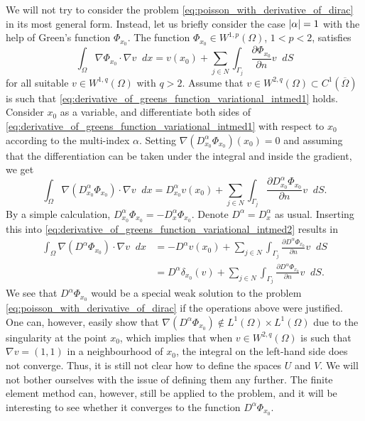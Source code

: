 \documentclass[english, 12pt, a4paper, sci, utf8, a-2b, online]{aaltothesis}
\theoremstyle{definition}
\theoremstyle{plain}
\DeclarePairedDelimiter\abs{\lvert}{\rvert}
\newcommand*\diff{\mathop{}\!d}
\numberwithin{equation}{section}
\begin{document}
We will not try to consider the problem \eqref{eq:poisson_with_derivative_of_dirac}
in its most general form.
Instead, let us briefly consider the case $\abs{\alpha} = 1$
with the help of Green's function $\Phi_{x_0}$.
The function $\Phi_{x_0} \in W^{1,p}(\Omega)$, $1 < p < 2$, satisfies
\begin{equation}
    \label{eq:derivative_of_greens_function_variational_intmed1}
    \int_{\Omega} \nabla \Phi_{x_0} \cdot \nabla v \diff x
    = v(x_0) + \sum_{j \in N} \int_{\Gamma_j}
        \frac{\partial \Phi_{x_0}}{\partial n} v \diff S
\end{equation}
for all suitable $v \in W^{1,q}(\Omega)$ with $q > 2$.
Assume that $v \in W^{2,q}(\Omega) \subset C^1(\overline{\Omega})$ is
such that \eqref{eq:derivative_of_greens_function_variational_intmed1} holds.
Consider $x_0$ as a variable, and differentiate both sides of
\eqref{eq:derivative_of_greens_function_variational_intmed1}
with respect to $x_0$ according to the multi-index $\alpha$.
Setting $\nabla (D_{x_0}^{\alpha} \Phi_{x_0})(x_0) = 0$ and
assuming that the differentiation can be taken under the integral
and inside the gradient, we get
\begin{equation}
    \label{eq:derivative_of_greens_function_variational_intmed2}
    \int_{\Omega} \nabla (D_{x_0}^{\alpha} \Phi_{x_0}) \cdot \nabla v \diff x
    = D_{x_0}^{\alpha} v(x_0) + \sum_{j \in N} \int_{\Gamma_j}
        \frac{\partial D_{x_0}^{\alpha} \Phi_{x_0}}{\partial n} v \diff S.
\end{equation}
By a simple calculation,
$D_{x_0}^{\alpha} \Phi_{x_0} = -D_x^{\alpha} \Phi_{x_0}$.
Denote $D^{\alpha} = D_x^{\alpha}$ as usual.
Inserting this into \eqref{eq:derivative_of_greens_function_variational_intmed2}
results in
\begin{align*}
    \int_{\Omega} \nabla (D^{\alpha} \Phi_{x_0}) \cdot \nabla v \diff x
    &= -D^{\alpha} v(x_0) + \sum_{j \in N} \int_{\Gamma_j}
        \frac{\partial D^{\alpha} \Phi_{x_0}}{\partial n} v \diff S \\
    &= D^{\alpha} \delta_{x_0}(v) + \sum_{j \in N} \int_{\Gamma_j}
        \frac{\partial D^{\alpha} \Phi_{x_0}}{\partial n} v \diff S.
\end{align*}
We see that $D^{\alpha} \Phi_{x_0}$ would be a special weak solution
to the problem \eqref{eq:poisson_with_derivative_of_dirac}
if the operations above were justified. One can, however, easily show that
$\nabla (D^{\alpha} \Phi_{x_0}) \notin L^1(\Omega) \times L^1(\Omega)$
due to the singularity at the point $x_0$,
which implies that when $v \in W^{2,q}(\Omega)$ is such that $\nabla v = (1,1)$
in a neighbourhood of $x_0$, the integral on the left-hand side does not converge.
Thus, it is still not clear how to define the spaces $U$ and $V$.
We will not bother ourselves with the issue of defining them any further.
The finite element method can, however, still be applied to the problem,
and it will be interesting to see whether it converges to the
function $D^{\alpha} \Phi_{x_0}$.
\end{document}
